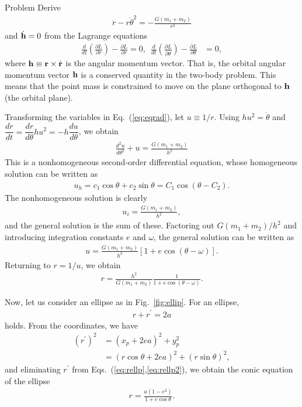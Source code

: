 \color{red}
\begin{itembox}{Problem}
\footnotesize
\color{gray}
Derive 
\begin{align}
\label{eq:eqrad}
 \ddot{r} - r \dot{\theta}^2 = - \frac{G (m_1+m_2)}{r^2}
\end{align}
and $\dot{\bf h} =  0$ from the Lagrange equations
\begin{align}
\frac{d}{dt} \left( \frac{\partial L}{\partial \dot{r}}\right) - \frac{\partial L}{\partial r} = 0, \,\,\,
\frac{d}{dt} \left( \frac{\partial L}{\partial \dot{\theta}}\right) - \frac{\partial L}{\partial \theta} &= 0, 
\end{align}
where
$
{\bf h} \equiv {\bf r} \times \dot{\bf r} 
$
is the angular momentum vector. That is, the orbital angular momentum vector ${\bf h}$ is a conserved quantity in the two-body problem. This means that the point mass is constrained to move on the plane orthogonal to ${\bf h}$ (the orbital plane).
\end{itembox}
\color{black}

Transforming the variables in Eq.~(\ref{eq:eqrad}), let $u \equiv 1/r$. Using $h u^2 = \dot{\theta}$ and $\dfrac{d r}{d t} = \dfrac{d r}{d \theta} h u^2 = - h \dfrac{d u}{d \theta}$, we obtain
\begin{align}
\frac{d^2 u}{d \theta^2} + u = \frac{G (m_1 + m_2)}{h^2}
\end{align}
This is a nonhomogeneous second-order differential equation, whose homogeneous solution can be written as
\begin{align}
u_h = c_1 \cos{\theta} + c_2 \sin{\theta} = C_1 \cos{(\theta - C_2)} .
\end{align}
The nonhomogeneous solution is clearly
\begin{align}
u_i = \frac{G (m_1 + m_2)}{h^2} ,
\end{align}
and the general solution is the sum of these. Factoring out $G (m_1 + m_2)/h^2$ and introducing integration constants $e$ and $\omega$, the general solution can be written as
\begin{align}
u = \frac{G (m_1 + m_2)}{h^2} [ 1 + e \cos{(\theta - \omega)}] .
\end{align}
Returning to $r=1/u$, we obtain
\begin{align}
\label{eq:eqkep}
r = \frac{h^2}{G (m_1 + m_2)} \frac{1}{ 1 + e \cos{(\theta - \omega)}} .
\end{align}

Now, let us consider an ellipse as in Fig.~\ref{fig:ellip}. For an ellipse,
\begin{align}
\label{eq:rellp}
r + r^\prime = 2 a
\end{align}
holds. From the coordinates, we have
\begin{align}
\label{eq:rellp2}
(r^\prime)^2 &= (x_p + 2 e a )^2 + y_p^2 \nonumber \\
&= (r \cos{\theta} + 2 e a )^2 + (r \sin{\theta})^2 ,
\end{align}
and eliminating $r^\prime$ from Eqs.~(\ref{eq:rellp},\ref{eq:rellp2}), we obtain the conic equation of the ellipse
\begin{align}
\label{eq:conic_orig}
r = \frac{a (1-e^2)}{ 1 + e \cos{\theta}} .
\end{align}


